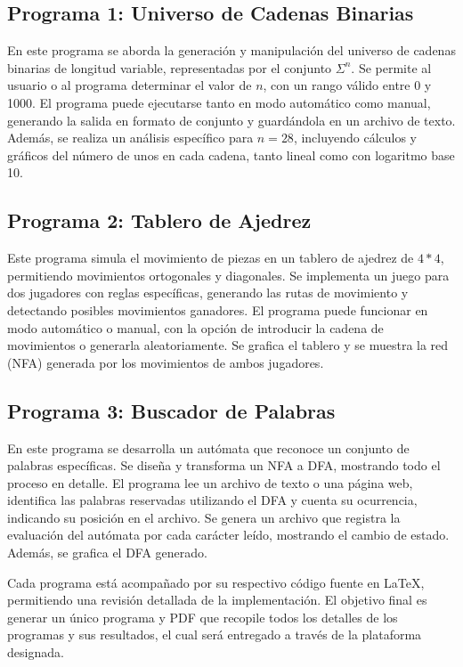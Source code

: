 \documentclass{article}
\begin{document}
\subsection*{Programa 1: Universo de Cadenas Binarias}
En este programa se aborda la generación y manipulación del universo de cadenas binarias de longitud variable, representadas por el
conjunto $\Sigma^n$. Se permite al usuario o al programa determinar el valor de $n$, con un rango válido entre 0 y 1000. El programa
puede ejecutarse tanto en modo automático como manual, generando la salida en formato de conjunto y guardándola en un archivo de texto. Además, se realiza un análisis específico para $n=28$, incluyendo cálculos y gráficos del número de unos en cada cadena, tanto lineal como con logaritmo base 10.

\subsection*{Programa 2: Tablero de Ajedrez}
Este programa simula el movimiento de piezas en un tablero de ajedrez de $4*{}4$, permitiendo movimientos ortogonales y diagonales.
Se implementa un juego para dos jugadores con reglas específicas, generando las rutas de movimiento y detectando posibles movimientos
ganadores. El programa puede funcionar en modo automático o manual, con la opción de introducir la cadena de movimientos o generarla
aleatoriamente. Se grafica el tablero y se muestra la red (NFA) generada por los movimientos de ambos jugadores.

\subsection*{Programa 3: Buscador de Palabras}
En este programa se desarrolla un autómata que reconoce un conjunto de palabras específicas. Se diseña y transforma un NFA a DFA,
mostrando todo el proceso en detalle. El programa lee un archivo de texto o una página web, identifica las palabras reservadas
utilizando el DFA y cuenta su ocurrencia, indicando su posición en el archivo. Se genera un archivo que registra la evaluación del
autómata por cada carácter leído, mostrando el cambio de estado. Además, se grafica el DFA generado.

Cada programa está acompañado por su respectivo código fuente en LaTeX, permitiendo una revisión detallada de la implementación.
El objetivo final es generar un único programa y PDF que recopile todos los detalles de los programas y sus resultados, el cual será
entregado a través de la plataforma designada.
\end{document}
